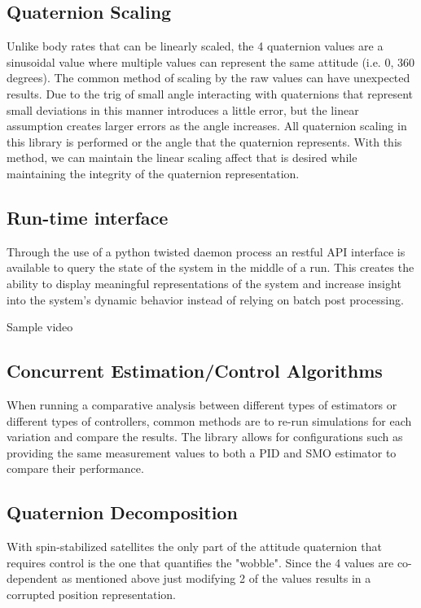 \subsection{Quaternion Scaling}

Unlike body rates that can be linearly scaled, the 4 quaternion values are a sinusoidal value where multiple values can represent the same attitude (i.e. 0, 360 degrees). The common method of scaling by the raw values can have unexpected results. Due to the trig of small angle interacting with quaternions that represent small deviations in this manner introduces a little error, but the linear assumption creates larger errors as the angle increases. All quaternion scaling in this library is performed or the angle that the quaternion represents. With this method, we can maintain the linear scaling affect that is desired while maintaining the integrity of the quaternion representation.

\subsection{Run-time interface}

Through the use of a python twisted daemon process an restful API interface is available to query the state of the system in the middle of a run. This creates the ability to display meaningful representations of the system and increase insight into the system's dynamic behavior instead of relying on batch post processing.

Sample video

\subsection{Concurrent Estimation/Control Algorithms}

When running a comparative analysis between different types of estimators or different types of controllers, common methods are to re-run simulations for each variation and compare the results. The library allows for configurations such as providing the same measurement values to both a PID and SMO estimator to compare their performance.

\subsection{Quaternion Decomposition}

With spin-stabilized satellites the only part of the attitude quaternion that requires control is the one that quantifies the "wobble". Since the 4 values are co-dependent as mentioned above just modifying 2 of the values results in a corrupted position representation.

